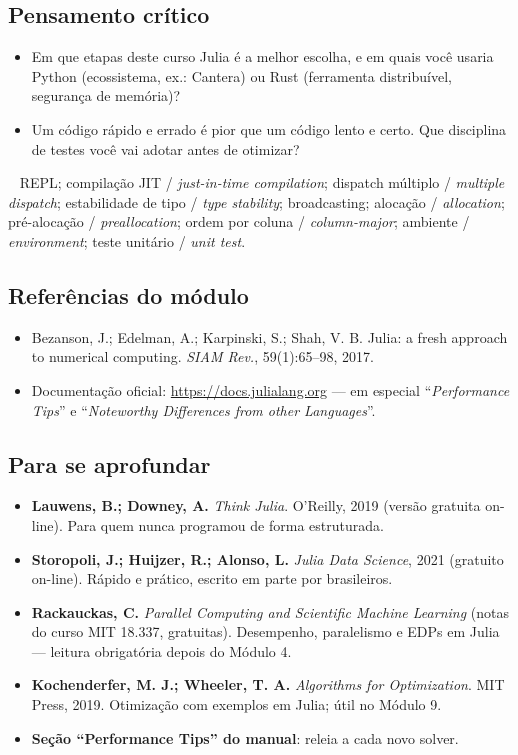 \documentclass[10pt,a4paper,twocolumn,openany]{report}
\newcommand{\lead}[2]{\par\medskip\noindent{\color{#1}\bfseries #2}\ }
\newenvironment{critico}{\subsection*{\textcolor{roxo}{Pensamento crítico}}}{\par}
\newenvironment{chaves}{\lead{cinza}{Palavras-chave (PT/EN):}\small}{\par}
\newenvironment{refs}{\subsection*{Referências do módulo}\small}{\par}
\newenvironment{aprofundar}{\subsection*{\textcolor{amarelo}{Para se aprofundar}}\small}{\par}
\begin{document}
\begin{critico}
\begin{itemize}
  \item Em que etapas deste curso Julia é a melhor escolha, e em quais você
        usaria Python (ecossistema, ex.: Cantera) ou Rust (ferramenta
        distribuível, segurança de memória)?
  \item Um código rápido e errado é pior que um código lento e certo. Que
        disciplina de testes você vai adotar antes de otimizar?
\end{itemize}
\end{critico}

\begin{chaves}
REPL; compilação JIT / \emph{just-in-time compilation}; dispatch múltiplo /
\emph{multiple dispatch}; estabilidade de tipo / \emph{type stability};
broadcasting; alocação / \emph{allocation}; pré-alocação /
\emph{preallocation}; ordem por coluna / \emph{column-major}; ambiente /
\emph{environment}; teste unitário / \emph{unit test}.
\end{chaves}

\begin{refs}
\begin{itemize}
  \item Bezanson, J.; Edelman, A.; Karpinski, S.; Shah, V. B. Julia: a fresh approach to numerical computing. \emph{SIAM Rev.}, 59(1):65--98, 2017.
  \item Documentação oficial: \url{https://docs.julialang.org} --- em especial ``\emph{Performance Tips}'' e ``\emph{Noteworthy Differences from other Languages}''.
\end{itemize}
\end{refs}

\begin{aprofundar}
\begin{itemize}[leftmargin=*]
  \item \textbf{Lauwens, B.; Downey, A.} \emph{Think Julia}. O'Reilly, 2019 (versão gratuita on-line). Para quem nunca programou de forma estruturada.
  \item \textbf{Storopoli, J.; Huijzer, R.; Alonso, L.} \emph{Julia Data Science}, 2021 (gratuito on-line). Rápido e prático, escrito em parte por brasileiros.
  \item \textbf{Rackauckas, C.} \emph{Parallel Computing and Scientific Machine Learning} (notas do curso MIT 18.337, gratuitas). Desempenho, paralelismo e EDPs em Julia --- leitura obrigatória depois do Módulo 4.
  \item \textbf{Kochenderfer, M. J.; Wheeler, T. A.} \emph{Algorithms for Optimization}. MIT Press, 2019. Otimização com exemplos em Julia; útil no Módulo 9.
  \item \textbf{Seção ``Performance Tips'' do manual}: releia a cada novo solver.
\end{itemize}
\end{aprofundar}
\end{document}

